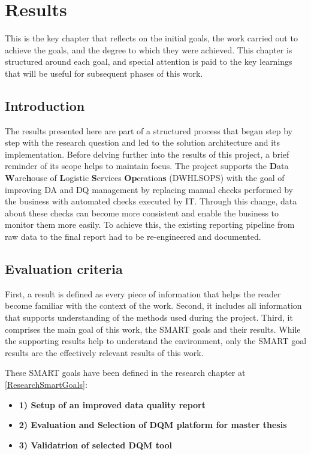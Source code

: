 \chapter{Results}

This is the key chapter that reflects on the initial goals, the work carried out to achieve the goals, and the degree to which they were achieved. This chapter is structured around each goal, and special attention is paid to the key learnings that will be useful for subsequent phases of this work.


\section{Introduction}
The results presented here are part of a structured process that began step by step with the research question and led to the solution architecture and its implementation. Before delving further into the results of this project, a brief reminder of its scope helps to maintain focus. The project supports the \textbf{D}ata \textbf{W}are\textbf{h}ouse of \textbf{L}ogistic \textbf{S}ervices \textbf{Op}eration\textbf{s} (\gls{DWHLSOPS}) with the goal of improving \gls{DA} and \gls{DQ} management by replacing manual checks performed by the business with automated checks executed by IT. Through this change, data about these checks can become more consistent and enable the business to monitor them more easily. To achieve this, the existing reporting pipeline from raw data to the final report had to be re-engineered and documented.



\section{Evaluation criteria}
First, a result is defined as every piece of information that helps the reader become familiar with the context of the work. Second, it includes all information that supports understanding of the methods used during the project. Third, it comprises the main goal of this work, the SMART goals and their results. While the supporting results help to understand the environment, only the SMART goal results are the effectively relevant results of this work.

These SMART goals have been defined in the research chapter at \ref{ResearchSmartGoals}:

\begin{itemize}
\item \textbf{1) Setup of an improved data quality report}
\item \textbf{2) Evaluation and Selection of DQM platform for master thesis}
\item \textbf{3) Validatrion of selected DQM tool}
\end{itemize}



